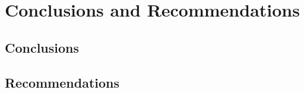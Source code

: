 \documentclass[conf]{new-aiaa}
\begin{document}



\section{Conclusions and Recommendations}
\subsection{Conclusions}

\subsection{Recommendations}
\end{document}
